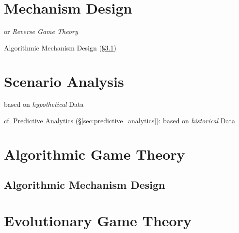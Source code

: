 \section{Mechanism Design}\label{sec:mechanism_design}

or \emph{Reverse Game Theory}

Algorithmic Mechanism Design (\S\ref{sec:algorithmic_mechanism_design})



\section{Scenario Analysis}\label{sec:scenario_analysis}

based on \emph{hypothetical} Data

cf. Predictive Analytics (\S\ref{sec:predictive_analytics}): based on
\emph{historical} Data



\section{Algorithmic Game Theory}\label{sec:algorithmic_game_theory}

\subsection{Algorithmic Mechanism Design}
\label{sec:algorithmic_mechanism_design}



\section{Evolutionary Game Theory}\label{sec:evolutionary_game_theory}

